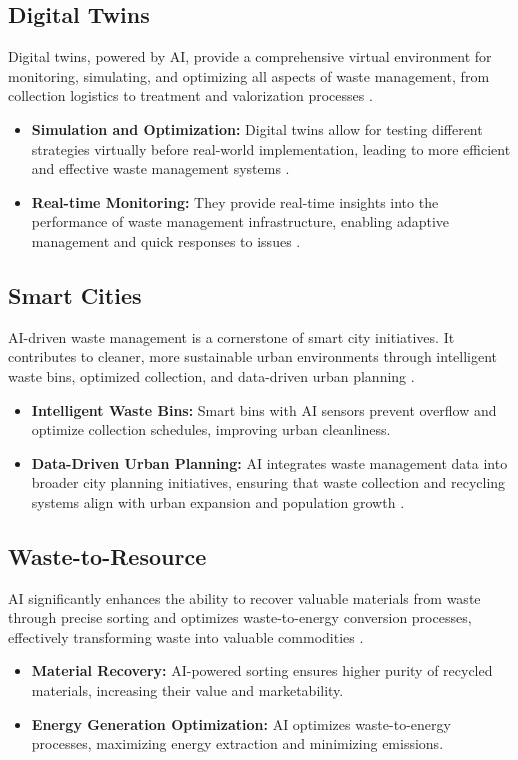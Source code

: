 \subsection{Digital Twins}
Digital twins, powered by AI, provide a comprehensive virtual environment for monitoring, simulating, and optimizing all aspects of waste management, from collection logistics to treatment and valorization processes \cite{Longdom_DigitalTwins}.
\begin{itemize}
    \item \textbf{Simulation and Optimization:}
Digital twins allow for testing different strategies virtually before real-world implementation, leading to more efficient and effective waste management systems \cite{MATJournals_DigitalTwins}.
    \item \textbf{Real-time Monitoring:}
They provide real-time insights into the performance of waste management infrastructure, enabling adaptive management and quick responses to issues \cite{McKinsey_DigitalTwins}.
\end{itemize}

\subsection{Smart Cities}
AI-driven waste management is a cornerstone of smart city initiatives. It contributes to cleaner, more sustainable urban environments through intelligent waste bins, optimized collection, and data-driven urban planning \cite{ResearchGate_SmartCities}.
\begin{itemize}
    \item \textbf{Intelligent Waste Bins:}
Smart bins with AI sensors prevent overflow and optimize collection schedules, improving urban cleanliness.
    \item \textbf{Data-Driven Urban Planning:}
AI integrates waste management data into broader city planning initiatives, ensuring that waste collection and recycling systems align with urban expansion and population growth \cite{PropVR_SmartCities}.
\end{itemize}

\subsection{Waste-to-Resource}
AI significantly enhances the ability to recover valuable materials from waste through precise sorting and optimizes waste-to-energy conversion processes, effectively transforming waste into valuable commodities \cite{DivaPortal_WasteToResource}.
\begin{itemize}
    \item \textbf{Material Recovery:}
AI-powered sorting ensures higher purity of recycled materials, increasing their value and marketability.
    \item \textbf{Energy Generation Optimization:}
AI optimizes waste-to-energy processes, maximizing energy extraction and minimizing emissions.
\end{itemize}

